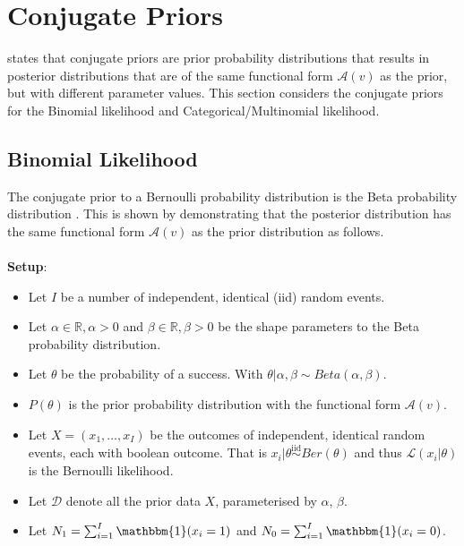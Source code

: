 \section{Conjugate Priors}\label{sec:probability:conjugate_priors}

\citeauthor{ref:wackerly:2014}\cite{ref:wackerly:2014} states that conjugate priors are prior probability distributions that results in posterior distributions that are of the same functional form $\mathcal{A}(v)$ as the prior, but with different parameter values. This section considers the conjugate priors for the Binomial likelihood and Categorical/Multinomial likelihood.

\subsection{Binomial Likelihood}\label{sec:probability:conjugate_priors:binom_likelihood}

The conjugate prior to a Bernoulli probability distribution is the Beta probability distribution
\cite{ref:wackerly:2014}. This is shown by demonstrating that the posterior distribution has the
same functional form $\mathcal{A}(v)$ as the prior distribution as follows. \\\\
\textbf{Setup}:

\begin{itemize}
      \item Let $I$ be a number of independent, identical  (iid) random events.

      \item Let $\alpha \in \mathbb{R}, \alpha > 0$ and $\beta \in \mathbb{R}, \beta >0$ be the shape parameters to the Beta probability distribution.

      \item Let $\theta$ be the probability of a success. With $\theta | \alpha, \beta \sim Beta(\alpha, \beta)$.

      \item $P(\theta)$ is the prior probability distribution with the functional form $\mathcal{A}(v)$.

      \item Let $X = (x_{1}, \dots, x_{I})$ be the outcomes of independent, identical random events, each with boolean outcome. That is $x_{i} | \theta \overset{\text{iid}}{\sim} Ber(\theta)$ and thus $\mathcal{L}(x_{i} \vert \theta)$ is the Bernoulli likelihood.

      \item Let $\mathcal{D}$ denote all the prior data $X$, parameterised by $\alpha$, $\beta$.

      \item Let $N_{1} = \sum_{i=1}^{I} \mathbbm{1}(x_{i} = 1)$ and $N_{0} = \sum_{i=1}^{I} \mathbbm{1}(x_{i} = 0)$.
\end{itemize}

